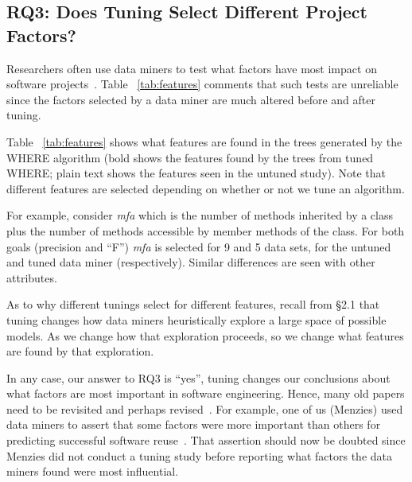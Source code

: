 \documentclass{sig-alternative}
\newcommand{\tab}[1]{Table ~\ref{tab:#1}}
\begin{document}
 \subsection{RQ3: Does Tuning Select Different Project Factors? }\label{sect:import}


Researchers often use data miners to  test what factors have most impact on software projects~\cite{bell2013limited,rahman2013how,me02k,Moser:2008,zimmermann2007predicting,herzig2013predicting}. 
\tab{features} comments that such tests are unreliable since the factors selected by a data miner are much altered before and 
after tuning.

\tab{features} shows what features are found in the trees generated by the WHERE algorithm
(bold shows the features found by the trees from tuned WHERE; plain text shows the features seen
in the untuned study). Note that different features are selected depending on whether or not
we tune an algorithm.

For example, consider {\em mfa} which is the
number of methods inherited by a class plus the number of methods accessible by member methods of the class.
For both goals (precision and ``F'') {\em mfa} is selected for 9 and 5 data sets,
for the untuned and tuned data miner (respectively).
Similar differences are   seen with other attributes.

As to why different tunings select for different features,  recall from {\S}2.1 that tuning changes how data miners
heuristically explore a large space of possible models. As we change how that exploration proceeds,
so we change what features are found by that exploration.

In any case, our answer to RQ3 is ``yes'', tuning changes our
conclusions about what factors are most important in software engineering.
Hence, many old papers    need to be revisited  and perhaps revised~\cite{bell2013limited,rahman2013how,me02k,Moser:2008,zimmermann2007predicting,herzig2013predicting}.  
For example, one of us (Menzies) used data miners
to assert that some factors were more important than others for predicting
successful software reuse~\cite{me02k}. That assertion should now be doubted since Menzies did not conduct a tuning study before reporting what factors the data miners
found were most influential.
\end{document}
